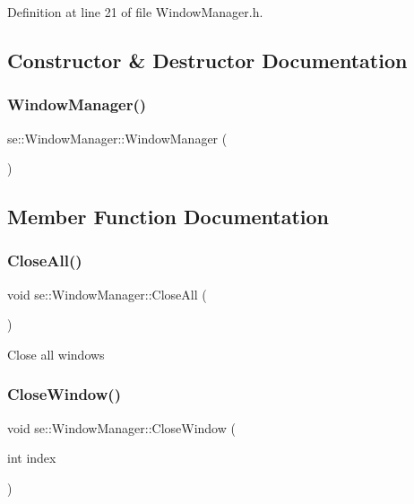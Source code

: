 Definition at line 21 of file Window\+Manager.\+h.



\subsection{Constructor \& Destructor Documentation}
\mbox{\label{classse_1_1_window_manager_a327899bc3f1f588ce0908f98a36c5b50}} 
\subsubsection{\texorpdfstring{Window\+Manager()}{WindowManager()}}
{\footnotesize\ttfamily se\+::\+Window\+Manager\+::\+Window\+Manager (\begin{DoxyParamCaption}{ }\end{DoxyParamCaption})}



\subsection{Member Function Documentation}
\mbox{\label{classse_1_1_window_manager_ae9106e9a62fa38456da31055f3a663ea}} 
\subsubsection{\texorpdfstring{Close\+All()}{CloseAll()}}
{\footnotesize\ttfamily void se\+::\+Window\+Manager\+::\+Close\+All (\begin{DoxyParamCaption}{ }\end{DoxyParamCaption})}

Close all windows \mbox{\label{classse_1_1_window_manager_a9a78ea2e729ff3e8395a1060a16346cd}} 
\subsubsection{\texorpdfstring{Close\+Window()}{CloseWindow()}}
{\footnotesize\ttfamily void se\+::\+Window\+Manager\+::\+Close\+Window (\begin{DoxyParamCaption}\item[{int}]{index }\end{DoxyParamCaption})}

